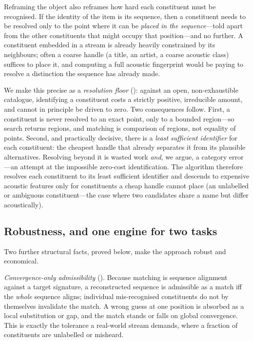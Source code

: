 \documentclass[11pt,twocolumn,a4paper]{article}
\theoremstyle{thmstyle}
\theoremstyle{definition}
\theoremstyle{remark}
\begin{document}
Reframing the object also reframes how hard each constituent must be recognised.
If the identity of the item is its sequence, then a constituent needs to be
resolved only to the point where it can be \emph{placed in the sequence}---told
apart from the other constituents that might occupy that position---and no
further. A constituent embedded in a stream is already heavily constrained by
its neighbours; often a coarse handle (a title, an artist, a coarse acoustic
class) suffices to place it, and computing a full acoustic fingerprint would be
paying to resolve a distinction the sequence has already made.

We make this precise as a \emph{resolution floor} (): against an
open, non-exhaustible catalogue, identifying a constituent costs a strictly
positive, irreducible amount, and cannot in principle be driven to zero. Two
consequences follow. First, a constituent is never resolved to an exact point,
only to a bounded region---so search returns regions, and matching is
comparison of regions, not equality of points. Second, and practically
decisive, there is a \emph{least sufficient identifier} for each constituent:
the cheapest handle that already separates it from its plausible alternatives.
Resolving beyond it is wasted work \emph{and}, we argue, a category error---an
attempt at the impossible zero-cost identification. The algorithm therefore
resolves each constituent to its least sufficient identifier and descends to
expensive acoustic features only for constituents a cheap handle cannot place
(an unlabelled or ambiguous constituent---the case where two candidates share a
name but differ acoustically).

\subsection{Robustness, and one engine for two tasks}

Two further structural facts, proved below, make the approach robust and
economical.

\emph{Convergence-only admissibility} (). Because matching is
sequence alignment against a target signature, a reconstructed sequence is
admissible as a match iff the \emph{whole} sequence aligns; individual
mis-recognised constituents do not by themselves invalidate the match. A wrong
guess at one position is absorbed as a local substitution or gap, and the match
stands or falls on global convergence. This is exactly the tolerance a
real-world stream demands, where a fraction of constituents are unlabelled or
misheard.
\end{document}
